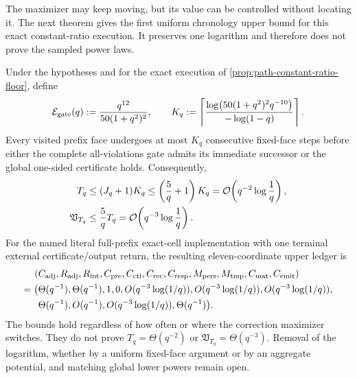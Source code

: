 The maximizer may keep moving, but its value can be controlled without
locating it.  The next theorem gives the first uniform chronology upper bound
for this exact constant-ratio execution.  It preserves one logarithm and
therefore does not prove the sampled power laws.

\begin{theorem}
\label{thm:path-moving-max-soft-upper}
Under the hypotheses and for the exact execution of
\cref{prop:path-constant-ratio-floor}, define
\begin{equation}
 \mathcal E_{\rm gate}(q)
 :=\frac{q^{12}}{50(1+q^2)^2},
 \qquad
 K_q:=\left\lceil
 \frac{\log\!\left(50(1+q^2)^2q^{-10}\right)}
      {-\log(1-q)}
 \right\rceil.
 \label{eq:path-moving-max-block-length}
\end{equation}
Every visited prefix face undergoes at most $K_q$ consecutive fixed-face
steps before either the complete all-violations gate admits its immediate
successor or the global one-sided certificate holds.  Consequently,
\begin{align}
 T_q
 &\leq (J_q+1)K_q
 \leq\left(\frac5q+1\right)K_q
 =\mathcal{O}\!\left(q^{-2}\log\frac1q\right),
 \label{eq:path-moving-max-stage-upper}\\
 \mathfrak V_{T_q}
 &\leq\frac5qT_q
 =\mathcal{O}\!\left(q^{-3}\log\frac1q\right).
 \label{eq:path-moving-max-volume-upper}
\end{align}
For the named literal full-prefix exact-cell implementation with one terminal
external certificate/output return, the resulting eleven-coordinate upper
ledger is
\begin{equation}
 \begin{aligned}
 (&C_{\rm adj},R_{\rm adj},R_{\rm int},C_{\rm pre},C_{\rm ctl},C_{\rm rec},
 C_{\rm resp},M_{\rm pers},M_{\rm tmp},C_{\rm mat},C_{\rm emit})\\
 =\bigl(&\Theta(q^{-1}),\Theta(q^{-1}),1,0,
 O(q^{-3}\log(1/q)),O(q^{-3}\log(1/q)),
 O(q^{-3}\log(1/q)),\\
 &\Theta(q^{-1}),O(q^{-1}),O(q^{-3}\log(1/q)),
 \Theta(q^{-1})\bigr).
 \end{aligned}
 \label{eq:path-moving-max-eleven-upper}
\end{equation}
The bounds hold regardless of how often or where the correction maximizer
switches.  They do not prove $T_q=\Theta(q^{-2})$ or
$\mathfrak V_{T_q}=\Theta(q^{-3})$.  Removal of the logarithm, whether by a
uniform fixed-face argument or by an aggregate potential, and matching global
lower powers remain open.
\end{theorem}

